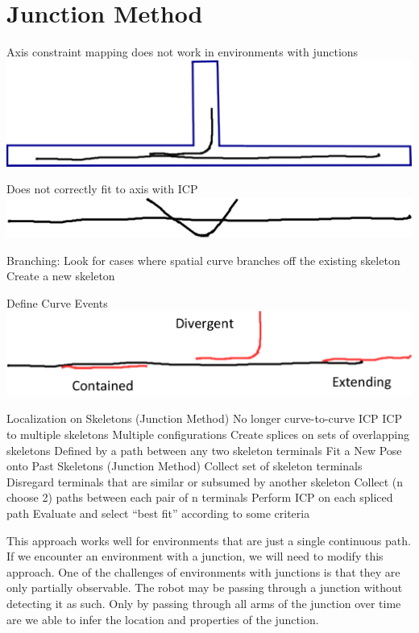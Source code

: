 \section{Junction Method}
\label{junctionmethod}

Axis constraint mapping does not work in environments with junctions
\includegraphics[keepaspectratio,width=\textwidth,height=0.75\textheight]{PastedGraphic.pdf}


Does not correctly fit to axis with ICP
\includegraphics[keepaspectratio,width=\textwidth,height=0.75\textheight]{PastedGraphic1.pdf}


Branching:
Look for cases where spatial curve branches off the existing skeleton
Create a new skeleton

Define Curve Events
\includegraphics[keepaspectratio,width=\textwidth,height=0.75\textheight]{PastedGraphic4.pdf}

Localization on Skeletons (Junction Method)
No longer curve-to-curve ICP
ICP to multiple skeletons
Multiple configurations
Create splices on sets of overlapping skeletons
Defined by a path between any two skeleton terminals
Fit a New Pose onto Past Skeletons (Junction Method)
Collect set of skeleton terminals
Disregard terminals that are similar or subsumed by another skeleton
Collect (n choose 2) paths between each pair of n terminals
Perform ICP on each spliced path
Evaluate and select “best fit” according to some criteria

This approach works well for environments that are just a single continuous path. If we encounter an environment with a junction, we will need to modify this approach. One of the challenges of environments with junctions is that they are only partially observable. The robot may be passing through a junction without detecting it as such. Only by passing through all arms of the junction over time are we able to infer the location and properties of the junction. 

